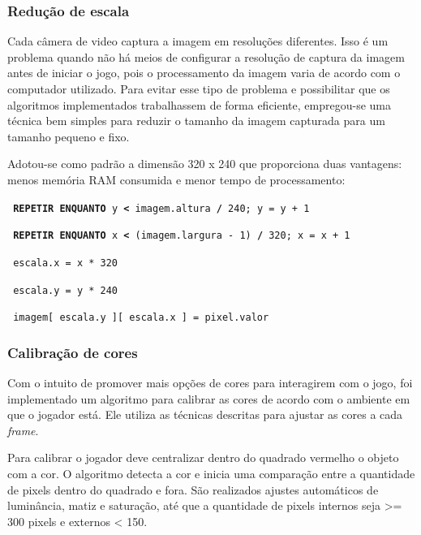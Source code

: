 \documentclass[12pt]{article}
\begin{document}
\subsubsection{Redu\c c\~ao de escala}
Cada c\^amera de video captura a imagem em resolu\c c\~oes diferentes. Isso \'e um problema quando n\~ao h\'a
meios de configurar a resolu\c c\~ao de captura da imagem antes de iniciar o jogo, pois o processamento da imagem
varia de acordo com o computador utilizado. Para evitar esse tipo de problema e possibilitar que os algoritmos implementados
trabalhassem de forma eficiente, empregou-se uma t\'ecnica bem simples para reduzir
o tamanho da imagem capturada para um tamanho pequeno e fixo.
 
Adotou-se como padr\~ao a dimens\~ao 320 x 240 que proporciona duas vantagens: menos mem\'oria RAM consumida
 e menor tempo de processamento:

\noindent \texttt{\footnotesize{ \textbf{REPETIR ENQUANTO} y \textbf{<} imagem.altura \textbf{/} 240; y = y + 1} }

\hspace{0.2cm} \texttt{\footnotesize{ \textbf{REPETIR ENQUANTO} x \textbf{<} (imagem.largura - 1) \textbf{/} 320; x = x + 1}}

\hspace{0.4cm} \texttt{\footnotesize{ escala.x = x * 320}}

\hspace{0.4cm} \texttt{\footnotesize{ escala.y = y * 240}}

\hspace{0.4cm} \texttt{\footnotesize{ imagem[ escala.y ][ escala.x ] = pixel.valor}}
\vspace{0.5cm}

\subsubsection{Calibra\c c\~ao de cores}
Com o intuito de promover mais op\c c\~oes de cores para interagirem com o jogo, foi implementado um
algoritmo para calibrar as cores de acordo com o ambiente em que o jogador est\'a. Ele utiliza as t\'ecnicas
descritas para ajustar as cores a cada \emph{frame}.

Para calibrar o jogador deve centralizar dentro do quadrado vermelho o objeto com a cor. O algoritmo detecta a cor
e inicia uma compara\c c\~ao entre a quantidade de pixels dentro do quadrado e fora. S\~ao realizados ajustes autom\'aticos
de lumin\^ancia, matiz e satura\c c\~ao, at\'e que a quantidade de pixels internos seja >= 300 pixels e externos < 150.
\end{document}
